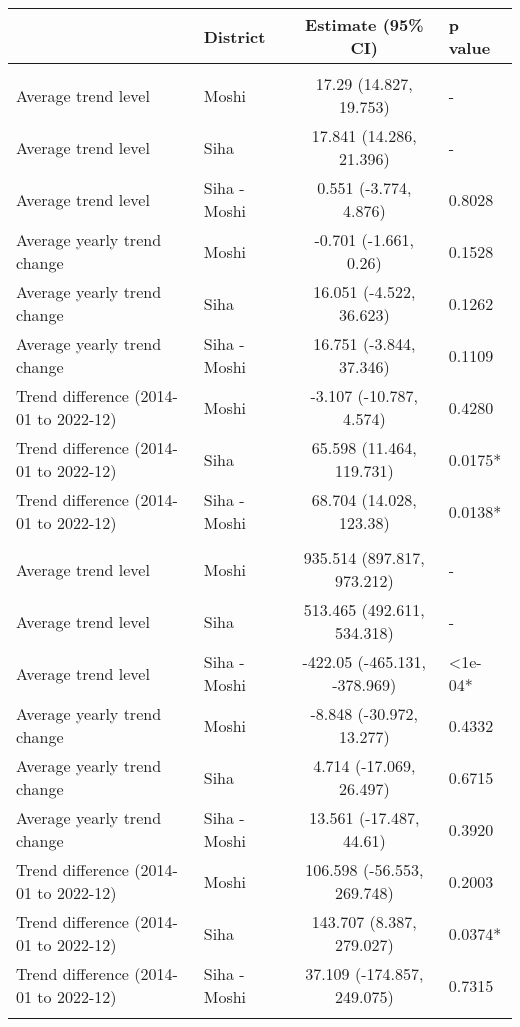 \begin{longtable}{l|lcl}
\toprule
\multicolumn{1}{l}{} & District & Estimate (95\% CI) & p value \\ 
\midrule\addlinespace[2.5pt]
\multicolumn{4}{l}{Cancer} \\ 
\midrule\addlinespace[2.5pt]
Average trend level & Moshi & 17.29 (14.827, 19.753) & - \\ 
Average trend level & Siha & 17.841 (14.286, 21.396) & - \\ 
Average trend level & Siha - Moshi & 0.551 (-3.774, 4.876) & 0.8028 \\ 
Average yearly trend change & Moshi & -0.701 (-1.661, 0.26) & 0.1528 \\ 
Average yearly trend change & Siha & 16.051 (-4.522, 36.623) & 0.1262 \\ 
Average yearly trend change & Siha - Moshi & 16.751 (-3.844, 37.346) & 0.1109 \\ 
Trend difference (2014-01 to 2022-12) & Moshi & -3.107 (-10.787, 4.574) & 0.4280 \\ 
Trend difference (2014-01 to 2022-12) & Siha & 65.598 (11.464, 119.731) & 0.0175* \\ 
Trend difference (2014-01 to 2022-12) & Siha - Moshi & 68.704 (14.028, 123.38) & 0.0138* \\ 
\midrule\addlinespace[2.5pt]
\multicolumn{4}{l}{Cardiovascular Diseases} \\ 
\midrule\addlinespace[2.5pt]
Average trend level & Moshi & 935.514 (897.817, 973.212) & - \\ 
Average trend level & Siha & 513.465 (492.611, 534.318) & - \\ 
Average trend level & Siha - Moshi & -422.05 (-465.131, -378.969) & <1e-04* \\ 
Average yearly trend change & Moshi & -8.848 (-30.972, 13.277) & 0.4332 \\ 
Average yearly trend change & Siha & 4.714 (-17.069, 26.497) & 0.6715 \\ 
Average yearly trend change & Siha - Moshi & 13.561 (-17.487, 44.61) & 0.3920 \\ 
Trend difference (2014-01 to 2022-12) & Moshi & 106.598 (-56.553, 269.748) & 0.2003 \\ 
Trend difference (2014-01 to 2022-12) & Siha & 143.707 (8.387, 279.027) & 0.0374* \\ 
Trend difference (2014-01 to 2022-12) & Siha - Moshi & 37.109 (-174.857, 249.075) & 0.7315 \\ 
\midrule\addlinespace[2.5pt]

\end{longtable}
